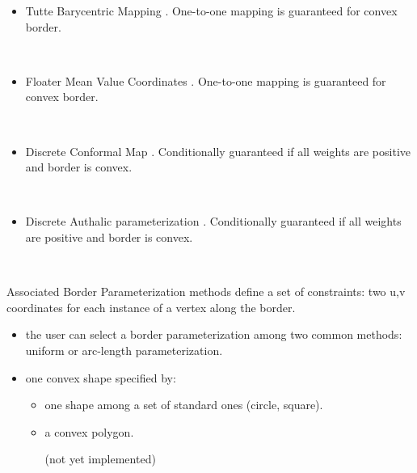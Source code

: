 \begin{itemize}

\item Tutte Barycentric Mapping \cite{cgal:fh-survey-05}.
One-to-one mapping is guaranteed for convex border.

  \\

\item Floater Mean Value Coordinates \cite{cgal:f-mvc-03}.
One-to-one mapping is guaranteed for convex border.

  \\

\item Discrete Conformal Map \cite{cgal:fh-survey-05}.
Conditionally guaranteed if all weights are positive and border is convex.

  \\

\item Discrete Authalic parameterization \cite{cgal:dma-ipsm-02}.
Conditionally guaranteed if all weights are positive and border is convex.

  \\

\end{itemize}

Associated Border Parameterization methods define a
set of constraints: two u,v coordinates for
each instance of a vertex along the border.

\begin{itemize}

\item the user can select a border
    parameterization among two common methods: uniform or
    arc-length parameterization.

\item one convex shape specified by:

    \begin{itemize}

    \item one shape among a set of standard ones (circle, square).

    \item a convex polygon.

    (not yet implemented)

    \end{itemize}

\end{itemize}

